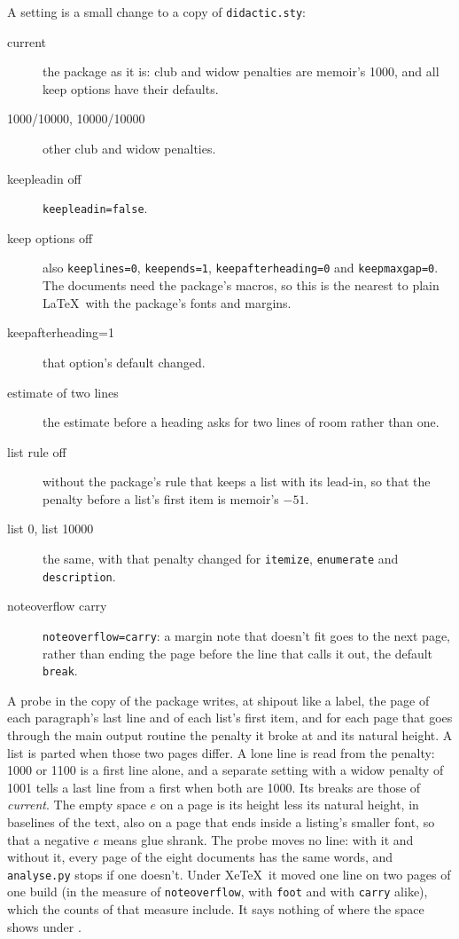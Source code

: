 A setting is a small change to a copy of \texttt{didactic.sty}:
\begin{description}
\item[current] the package as it is: club and widow penalties are \textsf{memoir}'s 1000, and all
  keep options have their defaults.
\item[1000/10000, 10000/10000] other club and widow penalties.
\item[keepleadin off] \texttt{keepleadin=false}.
\item[keep options off] also \texttt{keeplines=0}, \texttt{keepends=1},
  \texttt{keepafterheading=0} and \texttt{keepmaxgap=0}.
  The documents need the package's macros, so this is the nearest to plain \LaTeX\ with the
  package's fonts and margins.
\item[keepafterheading=1] that option's default changed.
\item[estimate of two lines] the estimate before a heading asks for two lines of room rather than one.
\item[list rule off] without the package's rule that keeps a list with its lead-in, so that the
  penalty before a list's first item is \textsf{memoir}'s $-51$.
\item[list 0, list 10000] the same, with that penalty changed for \texttt{itemize},
  \texttt{enumerate} and \texttt{description}.
\item[noteoverflow carry] \texttt{noteoverflow=carry}: a margin note that doesn't fit goes to the
  next page, rather than ending the page before the line that calls it out, the default \texttt{break}.
\end{description}

A probe in the copy of the package writes, at shipout like a label, the page of each paragraph's
last line and of each list's first item, and for each page that goes through the main output
routine the penalty it broke at and its natural height.
A list is parted when those two pages differ.
A lone line is read from the penalty: 1000 or 1100 is a first line alone, and a separate setting
with a widow penalty of 1001 tells a last line from a first when both are 1000.
Its breaks are those of \emph{current}.
The empty space $e$ on a page is its height less its natural height, in baselines of the text,
also on a page that ends inside a listing's smaller font, so that a negative $e$ means glue shrank.
The probe moves no line: with it and without it, every page of the eight documents has the same
words, and \texttt{analyse.py} stops if one doesn't.
Under Xe\TeX\ it moved one line on two pages of one build (in the measure of \texttt{noteoverflow},
with \texttt{foot} and with \texttt{carry} alike), which the counts of that measure include.
It says nothing of where the space shows under .

